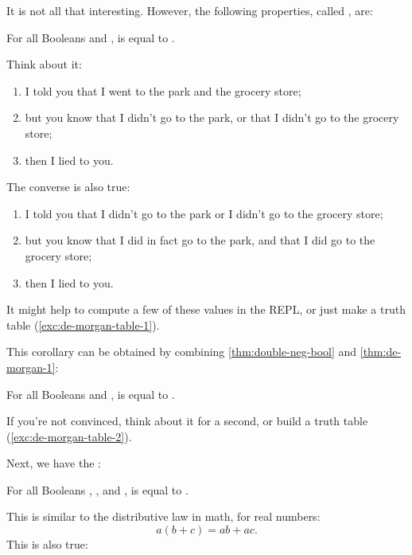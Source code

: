 It is not all that interesting. However, the following properties,
called , are:

\begin{lemma}
  \label{thm:de-morgan-1}
  For all Booleans  and ,  is
  equal to .
\end{lemma}

Think about it:

\begin{enumerate}
\item I told you that I went to the park and the grocery store;
\item but you know that I didn't go to the park, or that I didn't go
  to the grocery store;
\item then I lied to you.
\end{enumerate}

The converse is also true:

\begin{enumerate}
\item I told you that I didn't go to the park or I didn't go to the grocery store;
\item but you know that I did in fact go to the park, and that I did
  go to the grocery store;
\item then I lied to you.
\end{enumerate}

It might help to compute a few of these values in the REPL, or just
make a truth table (\cref{exc:de-morgan-table-1}).

This corollary can be obtained by combining \cref{thm:double-neg-bool}
and \cref{thm:de-morgan-1}:

\begin{corollary}
  \label{thm:de-morgan-2}
  For all Booleans  and ,  is equal
  to .
\end{corollary}

If you're not convinced, think about it for a second, or build a truth
table (\cref{exc:de-morgan-table-2}).

Next, we have the :

\begin{lemma}
  For all Booleans , , and ,  is equal to .
\end{lemma}

This is similar to the distributive law in math, for real
numbers: $$a(b + c) = ab + ac.$$ This is also true:

